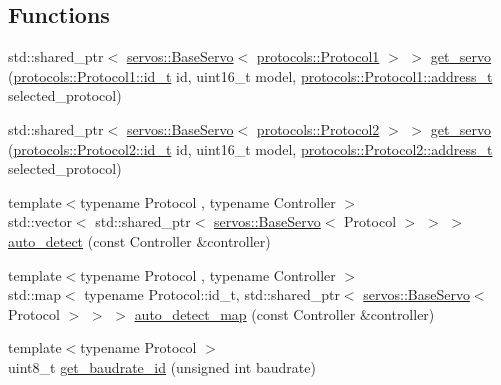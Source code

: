 \subsection*{Functions}
\begin{DoxyCompactItemize}
\item 
std\+::shared\+\_\+ptr$<$ \hyperlink{classdynamixel_1_1servos_1_1_base_servo}{servos\+::\+Base\+Servo}$<$ \hyperlink{classdynamixel_1_1protocols_1_1_protocol1}{protocols\+::\+Protocol1} $>$ $>$ \hyperlink{namespacedynamixel_a7ec8c7739824c939b1e8689bf731ade1}{get\+\_\+servo} (\hyperlink{classdynamixel_1_1protocols_1_1_protocol1_a1d4dfa22b01f80b1876d14f539d52b5c}{protocols\+::\+Protocol1\+::id\+\_\+t} id, uint16\+\_\+t model, \hyperlink{classdynamixel_1_1protocols_1_1_protocol1_a4383ba392b57ea00dd0273c6da5e8a65}{protocols\+::\+Protocol1\+::address\+\_\+t} selected\+\_\+protocol)
\item 
std\+::shared\+\_\+ptr$<$ \hyperlink{classdynamixel_1_1servos_1_1_base_servo}{servos\+::\+Base\+Servo}$<$ \hyperlink{classdynamixel_1_1protocols_1_1_protocol2}{protocols\+::\+Protocol2} $>$ $>$ \hyperlink{namespacedynamixel_aea272226c2da972ad4c097190e330c9a}{get\+\_\+servo} (\hyperlink{classdynamixel_1_1protocols_1_1_protocol2_a38d9cae72cd86213cca74e718c240429}{protocols\+::\+Protocol2\+::id\+\_\+t} id, uint16\+\_\+t model, \hyperlink{classdynamixel_1_1protocols_1_1_protocol2_ac5d0ba762aa1f860c0187d9e64982941}{protocols\+::\+Protocol2\+::address\+\_\+t} selected\+\_\+protocol)
\item 
{\footnotesize template$<$typename Protocol , typename Controller $>$ }\\std\+::vector$<$ std\+::shared\+\_\+ptr$<$ \hyperlink{classdynamixel_1_1servos_1_1_base_servo}{servos\+::\+Base\+Servo}$<$ Protocol $>$ $>$ $>$ \hyperlink{namespacedynamixel_a6e322b3a15fdc7fa93d1b0a221586b56}{auto\+\_\+detect} (const Controller \&controller)
\item 
{\footnotesize template$<$typename Protocol , typename Controller $>$ }\\std\+::map$<$ typename Protocol\+::id\+\_\+t, std\+::shared\+\_\+ptr$<$ \hyperlink{classdynamixel_1_1servos_1_1_base_servo}{servos\+::\+Base\+Servo}$<$ Protocol $>$ $>$ $>$ \hyperlink{namespacedynamixel_a89e3fa5a92c07ce07c925cad243be30e}{auto\+\_\+detect\+\_\+map} (const Controller \&controller)
\item 
{\footnotesize template$<$typename Protocol $>$ }\\uint8\+\_\+t \hyperlink{namespacedynamixel_a216c62a8f9df141fab312731c3b53e72}{get\+\_\+baudrate\+\_\+id} (unsigned int baudrate)

\end{DoxyCompactItemize}
